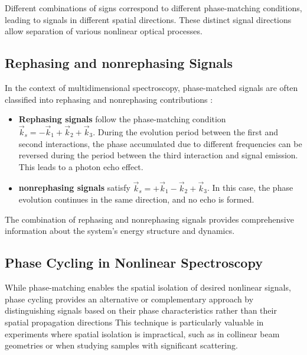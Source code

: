 \noindent Different combinations of signs correspond to different phase-matching conditions, leading to signals in different spatial directions. These distinct signal directions allow separation of various nonlinear optical processes.

\subsection{Rephasing and nonrephasing Signals}
\label{subsec:rephasing_nonrephasing}

\noindent In the context of multidimensional spectroscopy, phase-matched signals are often classified into rephasing and nonrephasing contributions \cite{cho2009twodimensionalopticalspectroscopy, jonas2003twodimensionalfemtosecondspectroscopy}:

\begin{itemize}
	\item \textbf{Rephasing signals} follow the phase-matching condition $\vec{k}_s = -\vec{k}_1 + \vec{k}_2 + \vec{k}_3$. During the evolution period between the first and second interactions, the phase accumulated due to different frequencies can be reversed during the period between the third interaction and signal emission. This leads to a photon echo effect.

	\item \textbf{nonrephasing signals} satisfy $\vec{k}_s = +\vec{k}_1 - \vec{k}_2 + \vec{k}_3$. In this case, the phase evolution continues in the same direction, and no echo is formed.
\end{itemize}

\noindent The combination of rephasing and nonrephasing signals provides comprehensive information about the system's energy structure and dynamics.

\subsection{Phase Cycling in Nonlinear Spectroscopy}
\label{subsec:phase_cycling}

\noindent While phase-matching enables the spatial isolation of desired nonlinear signals, phase cycling provides an alternative or complementary approach by distinguishing signals based on their phase characteristics rather than their spatial propagation directions %
This technique is particularly valuable in experiments where spatial isolation is impractical, such as in collinear beam geometries or when studying samples with significant scattering.

